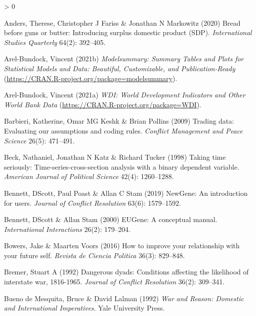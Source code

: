 \documentclass[
  11pt,
]{article}
\newlength{\cslhangindent}
\newenvironment{CSLReferences}[2] %
 {%
  \setlength{\parindent}{0pt}
  \ifodd #1 \everypar{\setlength{\hangindent}{\cslhangindent}}\ignorespaces\fi
  \ifnum #2 > 0
  \setlength{\parskip}{#2\baselineskip}
  \fi
 }%
 {}
\begin{document}
\hypertarget{refs}{}
\begin{CSLReferences}{1}{0}
\leavevmode\hypertarget{ref-andersetal2020bbgb}{}%
Anders, Therese, Christopher J Fariss \& Jonathan N Markowitz (2020) Bread before guns or butter: Introducing surplus domestic product (SDP). \emph{International Studies Quarterly} 64(2): 392--405.

\leavevmode\hypertarget{ref-arelbundock2021m}{}%
Arel-Bundock, Vincent (2021b) \emph{Modelsummary: Summary Tables and Plots for Statistical Models and Data: Beautiful, Customizable, and Publication-Ready} (\url{https://CRAN.R-project.org/package=modelsummary}).

\leavevmode\hypertarget{ref-arelbundock2021w}{}%
Arel-Bundock, Vincent (2021a) \emph{WDI: World Development Indicators and Other World Bank Data} (\url{https://CRAN.R-project.org/package=WDI}).

\leavevmode\hypertarget{ref-barbierietal2009td}{}%
Barbieri, Katherine, Omar MG Keshk \& Brian Pollins (2009) Trading data: Evaluating our assumptions and coding rules. \emph{Conflict Management and Peace Science} 26(5): 471--491.

\leavevmode\hypertarget{ref-becketal1998tts}{}%
Beck, Nathaniel, Jonathan N Katz \& Richard Tucker (1998) Taking time seriously: Time-series-cross-section analysis with a binary dependent variable. \emph{American Journal of Political Science} 42(4): 1260--1288.

\leavevmode\hypertarget{ref-bennettetal2019n}{}%
Bennett, DScott, Paul Poast \& Allan C Stam (2019) NewGene: An introduction for users. \emph{Journal of Conflict Resolution} 63(6): 1579--1592.

\leavevmode\hypertarget{ref-bennettstam2000e}{}%
Bennett, DScott \& Allan Stam (2000) EUGene: A conceptual manual. \emph{International Interactions} 26(2): 179--204.

\leavevmode\hypertarget{ref-bowersvoors2016hiyr}{}%
Bowers, Jake \& Maarten Voors (2016) How to improve your relationship with your future self. \emph{Revista de Ciencia Politica} 36(3): 829--848.

\leavevmode\hypertarget{ref-bremer1992ddc}{}%
Bremer, Stuart A (1992) Dangerous dyads: Conditions affecting the likelihood of interstate war, 1816-1965. \emph{Journal of Conflict Resolution} 36(2): 309--341.

\leavevmode\hypertarget{ref-bdmlalman1992wr}{}%
Bueno de Mesquita, Bruce \& David Lalman (1992) \emph{War and Reason: Domestic and International Imperatives}. Yale University Press.


\end{CSLReferences}
\end{document}
